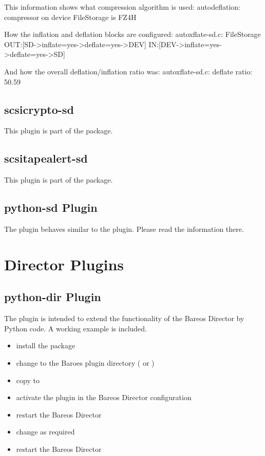 This information shows what compression algorithm is used:
autodeflation: compressor on device FileStorage is FZ4H

How the inflation and deflation blocks are configured:
autoxflate-sd.c: FileStorage OUT:[SD->inflate=yes->deflate=yes->DEV] IN:[DEV->inflate=yes->deflate=yes->SD]

And how the overall deflation/inflation ratio was:
autoxflate-sd.c: deflate ratio: 50.59%

\subsection{scsicrypto-sd}

This plugin is part of the  package.

\subsection{scsitapealert-sd}

This plugin is part of the  package.


\subsection{python-sd Plugin}

The  plugin behaves similar to the  plugin.
Please read the information there.


\section{Director Plugins}
\label{dirPlugins}

\subsection{python-dir Plugin}
\label{director-python-plugin}

The  plugin is intended to extend the functionality of the Bareos Director by Python code.
A working example is included.

\begin{itemize}
    \item install the  package
    \item change to the Baroes plugin directory ( or )
    \item copy  to 
    \item activate the plugin in the Bareos Director configuration
    \item restart the Bareos Director
    \item change  as required
    \item restart the Bareos Director
\end{itemize}

